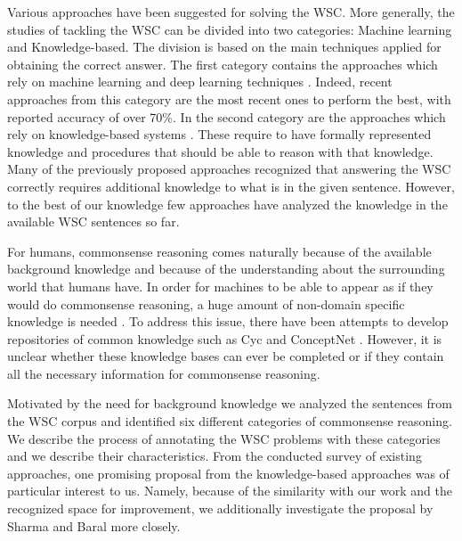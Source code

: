 Various approaches have been suggested for solving the WSC.
More generally, the studies of tackling the WSC can be divided into two categories: Machine learning and Knowledge-based. 
The division is based on the main techniques applied for obtaining the correct answer. The first category contains the approaches which rely on machine learning and deep learning techniques \cite{DBLP:conf/emnlp/RahmanN12, DBLP:journals/corr/LiuJLZWH16,  DBLP:journals/corr/abs-1806-02847}. Indeed, recent approaches from this category \cite{DBLP:journals/corr/abs-1806-02847, radford2019language} are the most recent ones to perform the best, with reported accuracy of over 70\%. In the second category are the approaches which rely on knowledge-based systems \cite{DBLP:conf/aaai/SharmaB16,DBLP:conf/emnlp/EmamiCTSC18,DBLP:conf/kr/Schuller14}. These require to have formally represented knowledge and procedures that should be able to reason with that knowledge. Many of the previously proposed approaches \cite{DBLP:conf/ijcai/SharmaVAB15, DBLP:conf/kr/Schuller14, DBLP:journals/corr/LiuJLZWH16, DBLP:conf/emnlp/EmamiCTSC18} recognized that answering the WSC correctly requires additional knowledge to what is in the given sentence. However, to the best of our knowledge few approaches have analyzed the knowledge in the available WSC sentences so far. 

For humans, commonsense reasoning comes naturally  because of the available background knowledge and because of the understanding about the surrounding world that humans have. In order for machines to be able to appear as if they would do commonsense reasoning, a huge amount of non-domain specific knowledge is needed \cite{DBLP:journals/ibmsj/McCarthyMSGLMMRSS02}. To address this issue, there have been attempts to develop repositories of common knowledge such as Cyc \cite{DBLP:journals/cacm/Lenat95} and ConceptNet \cite{articleC}. However, it is unclear whether these knowledge bases can ever be completed or if they contain all the necessary information for commonsense reasoning. 

Motivated by the need for background knowledge we analyzed the sentences from the WSC corpus and identified six different categories of commonsense reasoning. We describe the process of annotating the WSC problems with these categories and we describe their characteristics. 
From the conducted survey of existing approaches, one promising proposal from the knowledge-based approaches was of particular interest to us. Namely, because of the similarity with our work and the recognized space for improvement, we additionally investigate the proposal by Sharma and Baral \cite{2018CommonsenseKT} more closely.


